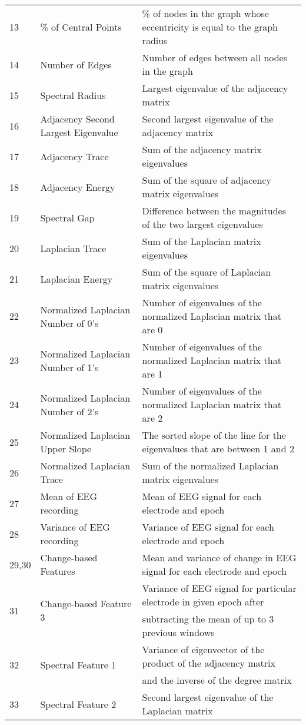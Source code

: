 \documentclass{article} %
\theoremstyle{definition}
\theoremstyle{remark}
\begin{document}
\begin{table}[htb]
\begin{tabular}{lll}
13&\% of Central Points&\% of nodes in the graph whose eccentricity is equal to the graph radius\\
14&Number of Edges&Number of edges between all nodes in the graph\\
15&Spectral Radius & Largest eigenvalue of the adjacency matrix\\
16&Adjacency Second Largest Eigenvalue&Second largest eigenvalue of the adjacency matrix\\
17&Adjacency Trace & Sum of the adjacency matrix eigenvalues\\
18&Adjacency Energy & Sum of the square of adjacency matrix eigenvalues\\
19&Spectral Gap &  Difference between the magnitudes of the two largest eigenvalues\\
20 &Laplacian Trace & Sum of the Laplacian matrix eigenvalues\\
21&Laplacian Energy &  Sum of the square of Laplacian matrix eigenvalues\\
22&Normalized Laplacian Number of 0's & Number of eigenvalues of the normalized Laplacian matrix that are 0\\
23&Normalized Laplacian Number of 1's&  Number of eigenvalues of the normalized Laplacian matrix that are 1\\
24&Normalized Laplacian Number of 2's& Number of eigenvalues of the normalized Laplacian matrix that are 2\\ 
25&Normalized Laplacian Upper Slope& The sorted slope of the line for the eigenvalues that are between 1 and 2\\
26&Normalized Laplacian Trace& Sum of the normalized Laplacian matrix eigenvalues\\
27&Mean of EEG recording&Mean of EEG signal for each electrode and epoch\\
28&Variance of EEG recording&Variance of EEG signal for each electrode and epoch\\
29,30&Change-based Features&Mean and variance of change in EEG signal for each electrode and epoch\\
\multirow{2}{*}{31}&\multirow{2}{*}{Change-based Feature 3}&Variance of EEG signal for particular electrode in given epoch after\\
&&subtracting the mean of up to 3 previous windows \\
\multirow{2}{*}{32}&\multirow{2}{*}{Spectral Feature 1}&Variance of eigenvector of the product of the adjacency matrix
\\&& and the inverse of the degree matrix\\
33&Spectral Feature 2&Second largest eigenvalue of the Laplacian matrix\\
\hline
\end{tabular}
\end{table}
\end{document}
